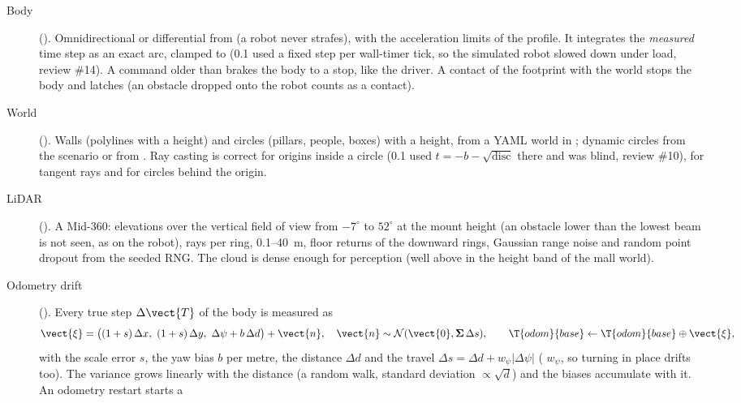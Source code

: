 \begin{description}
  \item[Body] (). Omnidirectional or differential from 
    (a  robot never strafes), with the acceleration limits of the profile. It
    integrates the \emph{measured} time step as an exact arc, clamped to  (0.1 used a
    fixed step per wall-timer tick, so the simulated robot slowed down under load, review \#14).
    A command older than  brakes the body to a stop, like the driver.
    A contact of the footprint with the world stops the body and latches 
    (an obstacle dropped onto the robot counts as a contact).
  \item[World] (). Walls (polylines with a height) and circles (pillars, people,
    boxes) with a height, from a YAML world in ; dynamic circles from the
    scenario or from . Ray casting is correct for origins inside a circle
    (0.1 used $t = -b - \sqrt{\mathrm{disc}}$ there and was blind, review \#10), for tangent rays
    and for circles behind the origin.
  \item[LiDAR] (). A Mid-360:  elevations over the vertical
    field of view from $-7^\circ$ to $52^\circ$ at the mount height (an obstacle lower than the
    lowest beam is not seen, as on the robot),  rays per ring, 0.1--40~m,
    floor returns of the downward rings, Gaussian range noise and random point dropout from the
    seeded RNG. The cloud is dense enough for perception (well above  in
    the height band of the mall world).
  \item[Odometry drift] (). Every true step $\Delta\vect{T}$ of the body is
    measured as
    \begin{equation}
      \vect{\xi} = \big((1+s)\,\Delta x,\ (1+s)\,\Delta y,\ \Delta\psi + b\,\Delta d\big) +
      \vect{n}, \quad \vect{n} \sim \mathcal{N}(\vect{0}, \boldsymbol{\Sigma}\,\Delta s), \qquad
      \T{odom}{base} \leftarrow \T{odom}{base} \oplus \vect{\xi},
    \end{equation}
    with the scale error $s$, the yaw bias $b$ per metre, the distance $\Delta d$ and the travel
    $\Delta s = \Delta d + w_\psi |\Delta\psi|$ ( $w_\psi$, so turning in
    place drifts too). The variance grows linearly with the distance (a random walk, standard
    deviation $\propto \sqrt{d}$) and the biases accumulate with it. An odometry restart starts a

\end{description}
